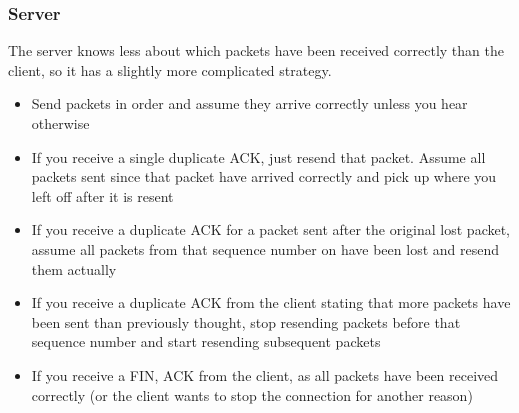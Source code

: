 \documentclass[12pt]{article}
\begin{document}
\subsubsection*{Server}
The server knows less about which packets have been received correctly than the client, so it has a slightly more complicated strategy.
\begin{itemize}
  \item Send packets in order and assume they arrive correctly unless you hear otherwise
  \item If you receive a single duplicate ACK, just resend that packet. Assume all packets sent since that packet have arrived correctly and pick up where you left off after it is resent
  \item If you receive a duplicate ACK for a packet sent after the original lost packet, assume all packets from that sequence number on have been lost and resend them actually
  \item If you receive a duplicate ACK from the client stating that more packets have been sent than previously thought, stop resending packets before that sequence number and start resending subsequent packets
  \item If you receive a FIN, ACK from the client, as all packets have been received correctly (or the client wants to stop the connection for another reason)
\end{itemize}
\end{document}
